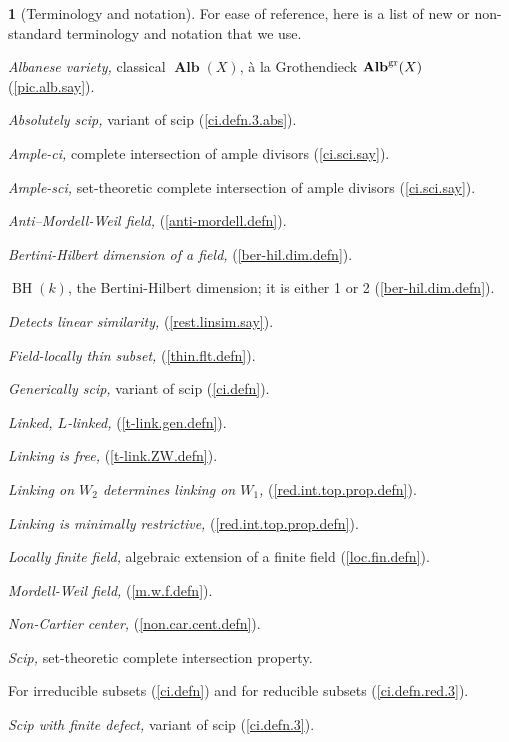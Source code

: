 \documentclass{amsart}
\theoremstyle{definition}
\newtheorem{say}[thm]{}
\theoremstyle{remark}
\newcommand{\alb}[0]{\operatorname{\mathbf{Alb}}}
\newcommand{\BH}[0]{\operatorname{BH}}
\begin{document}
\begin{say}[Terminology and notation] For ease of reference, here is a list of new or  non-standard terminology and notation that we use.




{\it Albanese variety,}  classical  $\alb(X)$, \`a la Grothendieck  $\alb^{\rm gr}(X)$  (\ref{pic.alb.say}). 



{\it Absolutely scip,}   variant of scip (\ref{ci.defn.3.abs}). 

{\it Ample-ci,} complete intersection of ample divisors   (\ref{ci.sci.say}). 

{\it Ample-sci,} set-theoretic complete intersection of ample divisors   (\ref{ci.sci.say}). 


{\it Anti--Mordell-Weil field,}  (\ref{anti-mordell.defn}). 

{\it Bertini-Hilbert dimension of a field,} (\ref{ber-hil.dim.defn}).

$\BH(k)$,  the Bertini-Hilbert dimension; it is either 1 or 2  (\ref{ber-hil.dim.defn}). 

{\it Detects  linear similarity,}    (\ref{rest.linsim.say}).


{\it Field-locally thin subset,}   (\ref{thin.flt.defn}). 


{\it Generically scip,} variant of scip   (\ref{ci.defn}). 

{\it Linked, $L$-linked,}  (\ref{t-link.gen.defn}).  

{\it Linking is free,}  (\ref{t-link.ZW.defn}). 

{\it Linking on  $W_2$  determines linking on  $W_1$,}
 (\ref{red.int.top.prop.defn}). 

{\it Linking is minimally restrictive,}   (\ref{red.int.top.prop.defn}). 

{\it Locally finite field,}  algebraic extension of a finite field  (\ref{loc.fin.defn}). 

{\it Mordell-Weil field,}  (\ref{m.w.f.defn}).

{\it Non-Cartier center,} (\ref{non.car.cent.defn}).  

{\it Scip,}  set-theoretic complete intersection property.  
\nopagebreak

\qquad For irreducible subsets  (\ref{ci.defn}) and for  reducible subsets  (\ref{ci.defn.red.3}). 

{\it Scip with finite defect,}  variant of scip  (\ref{ci.defn.3}). 

 

\end{say}
\end{document}
